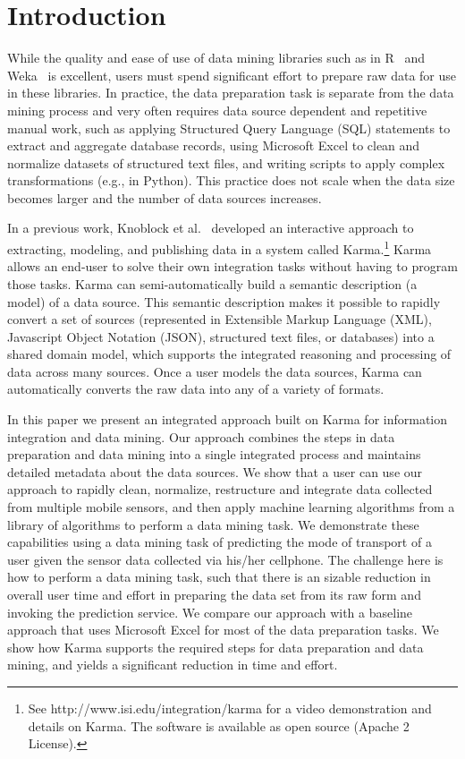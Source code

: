 \section{Introduction}
While the quality and ease of use of data mining libraries such as in R~\cite{R2008} and Weka~\cite{Hall2009} is excellent, users must spend significant effort to prepare raw data for use in these libraries. In practice, the data preparation task is separate from the data mining process and very often requires data source dependent and repetitive manual work, such as applying Structured Query Language (SQL) statements to extract and aggregate database records, using Microsoft Excel to clean and normalize datasets of structured text files, and writing scripts to apply complex transformations (e.g., in Python). This practice does not scale when the data size becomes larger and the number of data sources increases.

In a previous work, Knoblock et al.~\cite{knoblock12:eswc} developed an interactive approach to extracting, modeling, and publishing data in a system called Karma.\footnote{See http://www.isi.edu/integration/karma for a video demonstration and details on Karma. The software is available as open source (Apache 2 License).} Karma allows an end-user to solve their own integration tasks without having to program those tasks. Karma can semi-automatically build a semantic description (a model) of a data source. This semantic description makes it possible to rapidly convert a set of sources (represented in Extensible Markup Language (XML), Javascript Object Notation (JSON), structured text files, or databases) into a shared domain model, which supports the integrated reasoning and processing of data across many sources. Once a user models the data sources, Karma can automatically converts the raw data into any of a variety of formats.

In this paper we present an integrated approach built on Karma for information integration and data mining. Our approach combines the steps in data preparation and data mining into a single integrated process and maintains detailed metadata about the data sources. We show that a user can use our approach to rapidly clean, normalize, restructure and integrate data collected from multiple mobile sensors, and then apply machine learning algorithms from a library of algorithms to perform a data mining task. We demonstrate these capabilities using a data mining task of predicting the mode of transport of a user given the sensor data collected via his/her cellphone. The challenge here is how to perform a data mining task, such that there is an sizable reduction in overall user time and effort in preparing the data set from its raw form and invoking the prediction service. We compare our approach with a baseline approach that uses Microsoft Excel for most of the data preparation tasks. We show how Karma supports the required steps for data preparation and data mining, and yields a significant reduction in time and effort.


